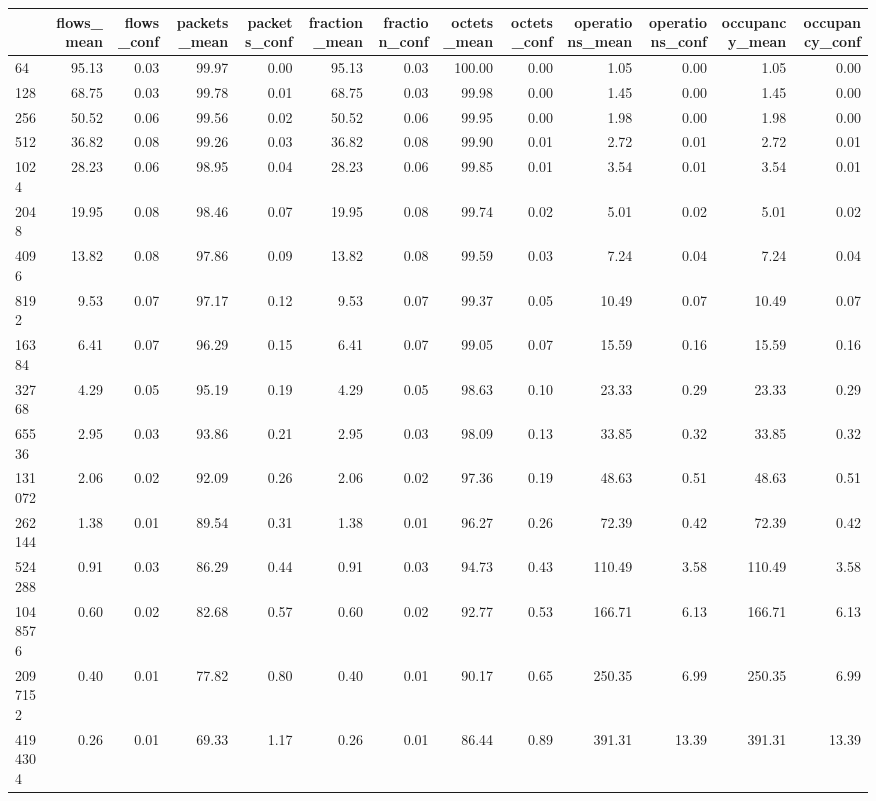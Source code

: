 \begin{tabular}{lrrrrrrrrrrrr}
\toprule
 & flows_mean & flows_conf & packets_mean & packets_conf & fraction_mean & fraction_conf & octets_mean & octets_conf & operations_mean & operations_conf & occupancy_mean & occupancy_conf \\
\midrule
64 & 95.13 & 0.03 & 99.97 & 0.00 & 95.13 & 0.03 & 100.00 & 0.00 & 1.05 & 0.00 & 1.05 & 0.00 \\
128 & 68.75 & 0.03 & 99.78 & 0.01 & 68.75 & 0.03 & 99.98 & 0.00 & 1.45 & 0.00 & 1.45 & 0.00 \\
256 & 50.52 & 0.06 & 99.56 & 0.02 & 50.52 & 0.06 & 99.95 & 0.00 & 1.98 & 0.00 & 1.98 & 0.00 \\
512 & 36.82 & 0.08 & 99.26 & 0.03 & 36.82 & 0.08 & 99.90 & 0.01 & 2.72 & 0.01 & 2.72 & 0.01 \\
1024 & 28.23 & 0.06 & 98.95 & 0.04 & 28.23 & 0.06 & 99.85 & 0.01 & 3.54 & 0.01 & 3.54 & 0.01 \\
2048 & 19.95 & 0.08 & 98.46 & 0.07 & 19.95 & 0.08 & 99.74 & 0.02 & 5.01 & 0.02 & 5.01 & 0.02 \\
4096 & 13.82 & 0.08 & 97.86 & 0.09 & 13.82 & 0.08 & 99.59 & 0.03 & 7.24 & 0.04 & 7.24 & 0.04 \\
8192 & 9.53 & 0.07 & 97.17 & 0.12 & 9.53 & 0.07 & 99.37 & 0.05 & 10.49 & 0.07 & 10.49 & 0.07 \\
16384 & 6.41 & 0.07 & 96.29 & 0.15 & 6.41 & 0.07 & 99.05 & 0.07 & 15.59 & 0.16 & 15.59 & 0.16 \\
32768 & 4.29 & 0.05 & 95.19 & 0.19 & 4.29 & 0.05 & 98.63 & 0.10 & 23.33 & 0.29 & 23.33 & 0.29 \\
65536 & 2.95 & 0.03 & 93.86 & 0.21 & 2.95 & 0.03 & 98.09 & 0.13 & 33.85 & 0.32 & 33.85 & 0.32 \\
131072 & 2.06 & 0.02 & 92.09 & 0.26 & 2.06 & 0.02 & 97.36 & 0.19 & 48.63 & 0.51 & 48.63 & 0.51 \\
262144 & 1.38 & 0.01 & 89.54 & 0.31 & 1.38 & 0.01 & 96.27 & 0.26 & 72.39 & 0.42 & 72.39 & 0.42 \\
524288 & 0.91 & 0.03 & 86.29 & 0.44 & 0.91 & 0.03 & 94.73 & 0.43 & 110.49 & 3.58 & 110.49 & 3.58 \\
1048576 & 0.60 & 0.02 & 82.68 & 0.57 & 0.60 & 0.02 & 92.77 & 0.53 & 166.71 & 6.13 & 166.71 & 6.13 \\
2097152 & 0.40 & 0.01 & 77.82 & 0.80 & 0.40 & 0.01 & 90.17 & 0.65 & 250.35 & 6.99 & 250.35 & 6.99 \\
4194304 & 0.26 & 0.01 & 69.33 & 1.17 & 0.26 & 0.01 & 86.44 & 0.89 & 391.31 & 13.39 & 391.31 & 13.39 \\

\end{tabular}
